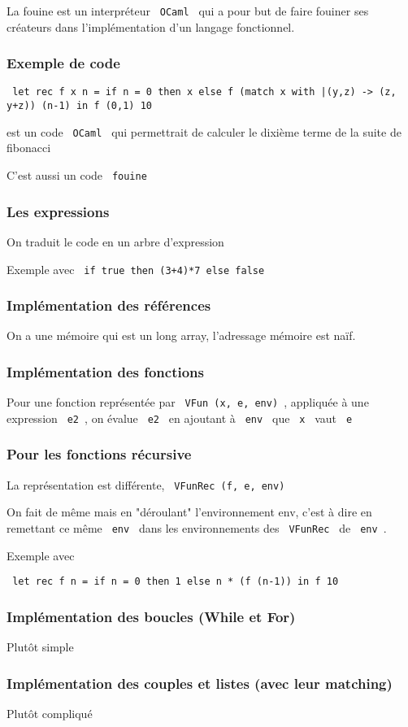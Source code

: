 \documentclass{beamer}
\title{\letitle}
\author{\leauthor}
\institute{}
\date{}
\begin{document}
\maketitle
\begin{frame}
La fouine est un interpréteur \texttt{ OCaml } qui a pour but de faire fouiner
ses créateurs dans l'implémentation d'un langage fonctionnel.

\end{frame}
\begin{frame}
\frametitle{Exemple de code}


\texttt{ let rec f x n = if n = 0 then x else f (match x with |(y,z) -> (z, y+z)) (n-1) in f (0,1) 10 }

est un code \texttt{ OCaml } qui permettrait de calculer le dixième terme de la suite de fibonacci

C'est aussi un code \texttt{ fouine }

\end{frame}
\begin{frame}
\frametitle{Les expressions}


On traduit le code en un arbre d'expression

Exemple avec \texttt{ if true then (3+4)*7 else false }

\end{frame}
\begin{frame}
\frametitle{Implémentation des références}


On a une mémoire qui est un long array, l'adressage mémoire est naïf.

\end{frame}
\begin{frame}
\frametitle{Implémentation des fonctions}


Pour une fonction représentée par \texttt{ VFun (x, e, env) },
appliquée à une expression \texttt{ e2 }, on évalue \texttt{ e2 }
en ajoutant à \texttt{ env } que \texttt{ x } vaut \texttt{ e }

\end{frame}
\begin{frame}
\frametitle{Pour les fonctions récursive}

La représentation est différente, \texttt{ VFunRec (f, e, env) }

On fait de même mais en "déroulant" l'environnement env, c'est à dire
en remettant ce même \texttt{ env } dans les environnements des \texttt{ VFunRec } de \texttt{ env }.

Exemple avec

\texttt{ let rec f n = if n = 0 then 1 else n * (f (n-1)) in f 10 }


\end{frame}
\begin{frame}
\frametitle{Implémentation des boucles (While et For)}


Plutôt simple
\end{frame}
\begin{frame}
\frametitle{Implémentation des couples et listes (avec leur matching)}


Plutôt compliqué
\end{frame}
\end{document}
